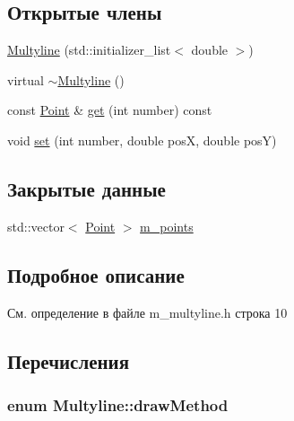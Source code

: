 \subsection*{Открытые члены}
\begin{DoxyCompactItemize}
\item 
\hyperlink{class_multyline_a36da9060517bf786ffd282587de95a12}{Multyline} (std\-::initializer\-\_\-list$<$ double $>$)
\item 
virtual \hyperlink{class_multyline_ae4a567046d3708fe823a9990b9925845}{$\sim$\-Multyline} ()
\item 
const \hyperlink{class_point}{Point} \& \hyperlink{class_multyline_a0afece4dd9493cc69000af9eeeeb05f1}{get} (int number) const 
\item 
void \hyperlink{class_multyline_a2a4f864d982d9cc8816f373380273359}{set} (int number, double pos\-X, double pos\-Y)
\end{DoxyCompactItemize}
\subsection*{Закрытые данные}
\begin{DoxyCompactItemize}
\item 
std\-::vector$<$ \hyperlink{class_point}{Point} $>$ \hyperlink{class_multyline_ad7dda18cb74eea9a937f5845160a0d69}{m\-\_\-points}
\end{DoxyCompactItemize}


\subsection{Подробное описание}


См. определение в файле m\-\_\-multyline.\-h строка 10



\subsection{Перечисления}
\hypertarget{class_multyline_ad75d7bb224267d0d7b4c40fd72a1d920}{
\subsubsection[{draw\-Method}]{\setlength{\rightskip}{0pt plus 5cm}enum {\bf Multyline\-::draw\-Method}}}\label{class_multyline_ad75d7bb224267d0d7b4c40fd72a1d920}


